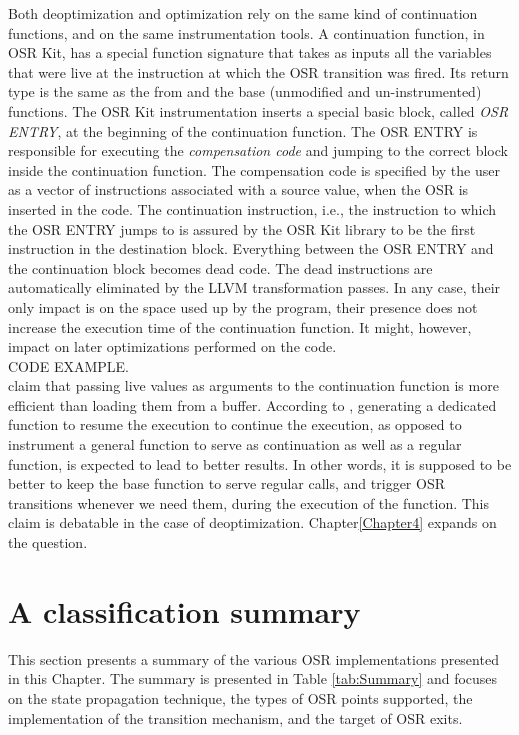 Both deoptimization and optimization rely on the same kind of continuation functions, and on the same instrumentation tools.
A continuation function, in OSR Kit, has a special function signature that takes as inputs all the variables that were live at the instruction at which the OSR transition was fired.
Its return type is the same as the from and the base (unmodified and un-instrumented) functions.
The OSR Kit instrumentation inserts a special basic block, called \textit{OSR ENTRY}, at the beginning of the continuation function.
The OSR ENTRY is responsible for executing the \textit{compensation code} and jumping to the correct block inside the continuation function.
The compensation code is specified by the user as a vector of instructions associated with a source value, when the OSR is inserted in the code.
The continuation instruction, i.e., the instruction to which the OSR ENTRY jumps to is assured by the OSR Kit library to be the first instruction in the destination block.
Everything between the OSR ENTRY and the continuation block becomes dead code.
The dead instructions are automatically eliminated by the LLVM transformation passes.
In any case, their only impact is on the space used up by the program, their presence does not increase the execution time of the continuation function.
It might, however, impact on later optimizations performed on the code.\\

CODE EXAMPLE.\\

 claim that passing live values as arguments to the continuation function is more efficient than loading them from a buffer.
According to \cite{fink2003design}, generating a dedicated function to resume the execution to continue the execution, as opposed to instrument a general function to serve as continuation as well as a regular function, is expected to lead to better results.
In other words, it is supposed to be better to keep the base function to serve regular calls, and trigger OSR transitions whenever we need them, during the execution of the function.
This claim is debatable in the case of deoptimization.
Chapter\ref{Chapter4} expands on the question.\\

\section{A classification summary}
This section presents a summary of the various OSR implementations presented in this Chapter.
The summary is presented in Table \ref{tab:Summary} and focuses on the state propagation technique, the types of OSR points supported, the implementation of the transition mechanism, and the target of OSR exits.\\

